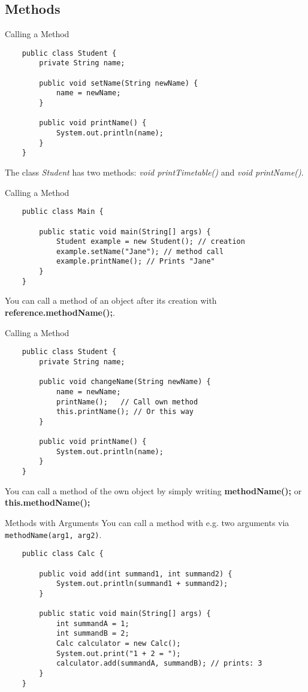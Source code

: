 \subsection{Methods}
\begin{frame}[fragile]{Calling a Method}
	\begin{lstlisting}
	public class Student {
		private String name;
	
	    public void setName(String newName) {
			name = newName;
	    }
	    
	    public void printName() {
	        System.out.println(name);
	    }
	}
	\end{lstlisting}
	The class \emph{Student} has two methods: \emph{void printTimetable()} and \emph{void printName()}.
\end{frame}

\begin{frame}[fragile]{Calling a Method}
\begin{lstlisting}
	public class Main {
	    
	    public static void main(String[] args) {
	        Student example = new Student(); // creation
	        example.setName("Jane"); // method call
	        example.printName(); // Prints "Jane"
	    }
	}
	\end{lstlisting}
	You can call a method of an object after its creation with \textbf{reference.methodName();}.
\end{frame}

\begin{frame}[fragile]{Calling a Method}
\begin{lstlisting}
	public class Student {
		private String name;
	
	    public void changeName(String newName) {
			name = newName;
			printName();   // Call own method
			this.printName(); // Or this way
	    }
	    
	    public void printName() {
	        System.out.println(name);
	    }
	}
	\end{lstlisting}
	You can call a method of the own object by simply writing \textbf{methodName();} or \textbf{this.methodName();}
\end{frame}

\begin{frame}[fragile]{Methods with Arguments}
	You can call a method with e.g. two arguments via \texttt{methodName(arg1, arg2)}.
	\begin{lstlisting}
	public class Calc {
	
	    public void add(int summand1, int summand2) {
	        System.out.println(summand1 + summand2);
	    }
	    
	    public static void main(String[] args) {
	        int summandA = 1;
	        int summandB = 2;
	        Calc calculator = new Calc();
	        System.out.print("1 + 2 = ");
	        calculator.add(summandA, summandB); // prints: 3
	    }
	}
	\end{lstlisting}
\end{frame}


